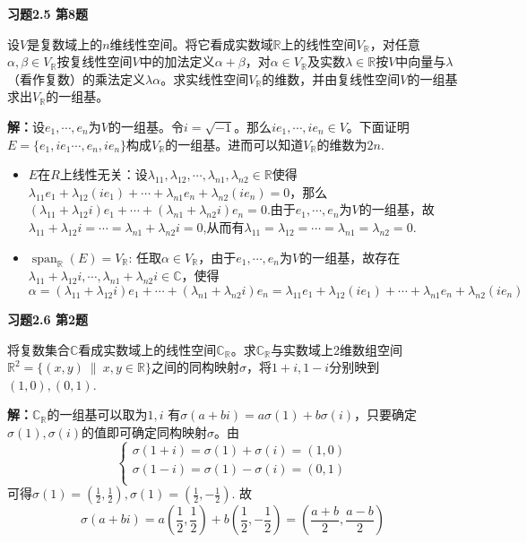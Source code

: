 \newpageorvspace

{\bf 习题2.5 第8题}

设$V$是复数域上的$n$维线性空间。将它看成实数域$\mathbb{R}$上的线性空间$V_{\mathbb{R}}$，对任意$\alpha,\beta\in V_{\mathbb{R}}$按复线性空间$V$中的加法定义$\alpha+\beta$，对$\alpha\in V_{\mathbb{R}}$及实数$\lambda\in\mathbb{R}$按$V$中向量与$\lambda$（看作复数）的乘法定义$\lambda\alpha$。求实线性空间$V_{\mathbb{R}}$的维数，并由复线性空间$V$的一组基求出$V_{\mathbb{R}}$的一组基。

{\bf 解：}设$e_1,\cdots,e_n$为$V$的一组基。令$i=\sqrt{-1}$。那么$ie_1,\cdots,ie_n\in V$。下面证明$E = \{ e_1,ie_1\cdots,e_n,ie_n\}$构成$V_{\mathbb{R}}$的一组基。进而可以知道$V_{\mathbb{R}}$的维数为$2n$.
\begin{itemize}
\item $E$在$R$上线性无关：设$\lambda_{11},\lambda_{12},\cdots,\lambda_{n1},\lambda_{n2}\in\mathbb{R}$使得$\lambda_{11}e_1+\lambda_{12}(ie_1)+\cdots+\lambda_{n1}e_n+\lambda_{n2}(ie_n) = 0$，那么$(\lambda_{11}+\lambda_{12}i)e_1+\cdots+(\lambda_{n1}+\lambda_{n2}i)e_n = 0$.由于$e_1,\cdots,e_n$为$V$的一组基，故$\lambda_{11}+\lambda_{12}i=\cdots=\lambda_{n1}+\lambda_{n2}i=0$,从而有$\lambda_{11}=\lambda_{12}=\cdots=\lambda_{n1}=\lambda_{n2}=0$.
\item $\operatorname{span}_{\mathbb{R}}(E) = V_{\mathbb{R}}$: 任取$\alpha\in V_{\mathbb{R}}$，由于$e_1,\cdots,e_n$为$V$的一组基，故存在$\lambda_{11}+\lambda_{12}i,\cdots,\lambda_{n1}+\lambda_{n2}i\in\mathbb{C}$，使得
$$\alpha = (\lambda_{11}+\lambda_{12}i)e_1 + \cdots + (\lambda_{n1}+\lambda_{n2}i)e_n = \lambda_{11}e_1+\lambda_{12}(ie_1) + \cdots + \lambda_{n1}e_n+\lambda_{n2}(ie_n)$$
\end{itemize}

\newpageorvspace

{\bf 习题2.6 第2题}

将复数集合$\mathbb{C}$看成实数域上的线性空间$\mathbb{C}_{\mathbb{R}}$。求$\mathbb{C}_{\mathbb{R}}$与实数域上2维数组空间$\mathbb{R}^2 = \{ (x,y) \ \|\ x,y\in\mathbb{R} \}$之间的同构映射$\sigma$，将$1+i,1-i$分别映到$(1,0), (0,1)$.

{\bf 解：}$\mathbb{C}_{\mathbb{R}}$的一组基可以取为$1,i$ 有$\sigma(a+bi) = a\sigma(1) + b\sigma(i)$，只要确定$\sigma(1), \sigma(i)$的值即可确定同构映射$\sigma$。由
$$
\begin{cases}
\sigma(1+i) = \sigma(1) + \sigma(i) =(1,0) \\
\sigma(1-i) = \sigma(1) - \sigma(i) =(0,1) \\
\end{cases}
$$
可得$\sigma(1) = \left(\frac{1}{2}, \frac{1}{2}\right), \sigma(1) = \left(\frac{1}{2}, -\frac{1}{2}\right)$. 故
$$\sigma(a+bi) = a \left( \frac{1}{2}, \frac{1}{2} \right) + b \left( \frac{1}{2}, -\frac{1}{2} \right) = \left( \frac{a+b}{2}, \frac{a-b}{2} \right)$$

